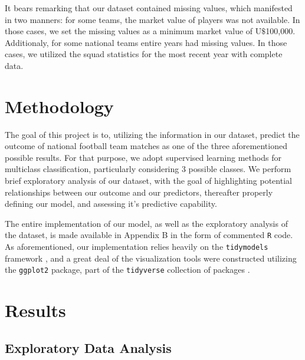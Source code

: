 \documentclass[12pt,paper=letter,leqno]{scrartcl}
\begin{document}
It bears remarking that our dataset contained missing values, which manifested in two manners: for some teams, the market value of players was not available. In those cases, we set the missing values as a minimum market value of $\text{U}\$$100,000. Additionaly, for some national teams entire years had missing values. In those cases, we utilized the squad statistics for the most recent year with complete data.

\section{Methodology}

The goal of this project is to, utilizing the information in our dataset, predict the outcome of national football team matches as one of the three aforementioned possible results. For that purpose, we adopt supervised learning methods for multiclass classification, particularly considering 3 possible classes. We perform brief exploratory analysis of our dataset, with the goal of highlighting potential relationships between our outcome and our predictors, thereafter properly defining our model, and assessing it's predictive capability.

The entire implementation of our model, as well as the exploratory analysis of the dataset, is made available in Appendix B in the form of commented \texttt{R} code. As aforementioned, our implementation relies heavily on the \texttt{tidymodels} framework \parencite{tidymodels}, and a great deal of the visualization tools were constructed utilizing the \texttt{ggplot2} package, part of the \texttt{tidyverse} collection of packages \parencite{tidyverse}.

\section{Results}
\subsection{Exploratory Data Analysis}
\end{document}
